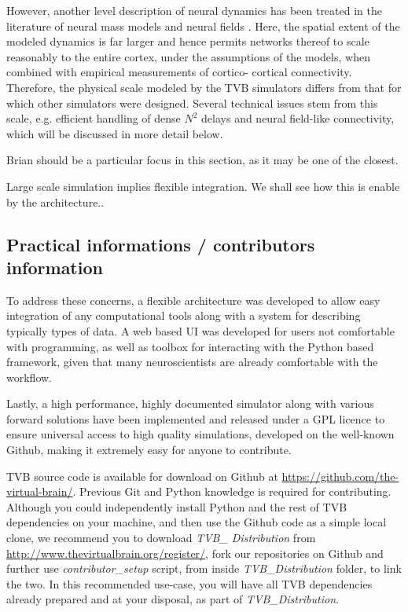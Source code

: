 However, another level description of neural dynamics has been treated
in the literature of neural mass models and neural fields 
\cite{Deco_2008a, Coombes_2010}. Here, the spatial
extent of the modeled dynamics is far larger and hence permits networks 
thereof to scale reasonably to the entire cortex, under the assumptions 
of the models, when combined with empirical measurements of cortico-
cortical connectivity. Therefore, the physical scale modeled by the TVB
simulators differs from that for which other simulators were designed.
Several technical issues stem from this scale, e.g. efficient handling
of dense $N^2$ delays and neural field-like connectivity, which will be
discussed in more detail below. 


	Brian should be a particular focus in this section, as it may
    be one of the closest.  

Large scale simulation implies flexible integration. We shall see
how this is enable by the architecture..

\subsection{Practical informations / contributors information}

To address these concerns, a flexible architecture was developed to
allow easy integration of any computational tools along with a system
for describing typically types of data. A web based UI was developed
for users not comfortable with programming, as well as \matlab{} toolbox
for interacting with the Python based framework, given that many
neuroscientists are already comfortable with the \matlab{} workflow.

Lastly, a high performance, highly documented simulator along with
various forward solutions have been implemented and released under a
GPL licence to ensure universal access to high quality simulations, 
developed on the well-known Github, making it extremely easy for 
anyone to contribute.

TVB source code is available for download on Github at
\url{https://github.com/the-virtual-brain/}.  Previous Git and Python knowledge
is required for contributing.  Although you could independently install Python
and the rest of TVB dependencies on your machine, and then use the Github code
as a simple local clone, we recommend you to download \emph{TVB\_ Distribution}
from \url{http://www.thevirtualbrain.org/register/}, fork our repositories on
Github and further use \emph{contributor\_setup} script, from inside \emph{TVB\_Distribution} 
folder, to link the two.  In this recommended use-case, you will
have all TVB dependencies already prepared and at your disposal, as part of
\emph{TVB\_Distribution}. 

